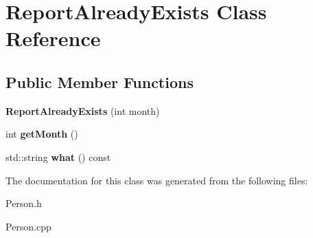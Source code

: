 \hypertarget{class_report_already_exists}{}\section{Report\+Already\+Exists Class Reference}
\label{class_report_already_exists}
\subsection*{Public Member Functions}
\begin{DoxyCompactItemize}
\item 
\mbox{\label{class_report_already_exists_add9175e1939193586e63a421bf9d2870}} 
{\bfseries Report\+Already\+Exists} (int month)
\item 
\mbox{\label{class_report_already_exists_a1521d7f897144a910951b37f132cd922}} 
int {\bfseries get\+Month} ()
\item 
\mbox{\label{class_report_already_exists_a66103e5ca6a4b84f3492493b7ced740d}} 
std\+::string {\bfseries what} () const
\end{DoxyCompactItemize}


The documentation for this class was generated from the following files\+:\begin{DoxyCompactItemize}
\item 
Person.\+h\item 
Person.\+cpp\end{DoxyCompactItemize}
